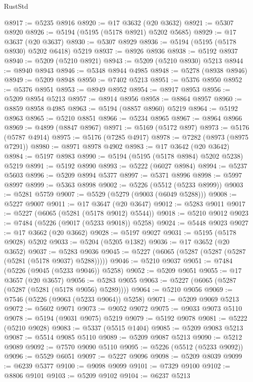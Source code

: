\begin{lexlean}{RustStd}
\begin{coremodule}
@8917 := @5235 @8916
@8920 := @17 @3632 (@20 @3632)
@8921 := @5307 @8920
@8926 := @5194 (@5195 (@5178 @8921) @5202 @5685)
@8929 := @17 @3637 (@20 @3637)
@8930 := @5307 @8929
@8936 := @5194 (@5195 (@5178 @8930) @5202 @6418) @5219
@8937 := @8926 @8936
@8938 := @5192 @8937
@8940 := @5209 (@5210 @8921)
@8943 := @5209 (@5210 @8930) @5213
@8944 := @8940 @8943
@8946 := @5348 @8944 @4985
@8948 := @5278 (@8938 @8946)
@8949 := @5209 @8948
@8950 := @7402 @5213
@8951 := @5376 @8950
@8952 := @5376 @8951
@8953 := @8949 @8952
@8954 := @8917 @8953
@8956 := @5209 @8954 @5213
@8957 := @8914 @8956
@8958 := @8864 @8957
@8960 := @8859 @8958 @4985
@8963 := @5194 (@8857 @8960) @5219
@8964 := @5192 @8963
@8965 := @5210 @8851
@8966 := @5234 @8965
@8967 := @8964 @8966
@8969 := @4899 (@8847 @8967)
@8971 := @5169 (@5172 @897)
@8973 := @5176 (@5787 @4914)
@8975 := @5176 (@7285 @4917)
@8978 := @7282 (@8973 (@8975 @7291))
@8980 := @8971 @8978 @4902
@8983 := @17 @3642 (@20 @3642)
@8984 := @5197 @8983
@8990 := @5194 (@5195 (@5178 @8984) @5202 @5238) @5219
@8991 := @5192 @8990
@8993 := @5222 (@6027 @8984)
@8994 := @5237 @5603
@8996 := @5209 @8994 @5377
@8997 := @5371 @8996
@8998 := @5997 @8997
@8999 := @5363 @8998
@9002 := @5226 (@5512 (@5233 @8999))
@9003 := @5281 @5759
@9007 := @5529 (@5279 (@9003 (@6049 @5288)))
@9008 := @5227 @9007
@9011 := @17 @3647 (@20 @3647)
@9012 := @5283 @9011
@9017 := @5227 (@6065 (@5281 (@5178 @9012) @5544))
@9018 := @5210 @9012
@9023 := @7484 (@5226 (@9017 (@5233 @9018)) @5258)
@9024 := @5448 @9023
@9027 := @17 @3662 (@20 @3662)
@9028 := @5197 @9027
@9031 := @5195 (@5178 @9028) @5202
@9033 := @5204 (@5205 @1382)
@9036 := @17 @3652 (@20 @3652)
@9037 := @5283 @9036
@9045 := @5227 (@6065 (@5287 (@5287 (@5287 (@5281 (@5178 @9037) @5288)))))
@9046 := @5210 @9037
@9051 := @7484 (@5226 (@9045 (@5233 @9046)) @5258)
@9052 := @5209 @9051
@9055 := @17 @3657 (@20 @3657)
@9056 := @5283 @9055
@9063 := @5227 (@6065 (@5287 (@5287 (@5281 (@5178 @9056) @5289))))
@9064 := @5210 @9056
@9069 := @7546 (@5226 (@9063 (@5233 @9064)) @5258)
@9071 := @5209 @9069 @5213
@9072 := @5602 @9071
@9073 := @9052 @9072
@9075 := @9033 @9073 @5110
@9078 := @5194 (@9031 @9075) @5219
@9079 := @5192 @9078
@9081 := @5222 (@5210 @9028)
@9083 := @5337 (@5515 @1404)
@9085 := @5209 @9083 @5213
@9087 := @5514 @9085 @5110
@9089 := @5209 @9087 @5213
@9090 := @5212 @9089
@9092 := @7570 @9090 @5110
@9095 := @5226 (@5512 (@5233 @9092))
@9096 := @5529 @6051
@9097 := @5227 @9096
@9098 := @5209 @8039
@9099 := @6239 @5377
@9100 := @9098 @9099
@9101 := @7329 @9100
@9102 := @8806 @9101
@9103 := @5209 @9102
@9104 := @6237 @5213

\end{coremodule}
\end{lexlean}
